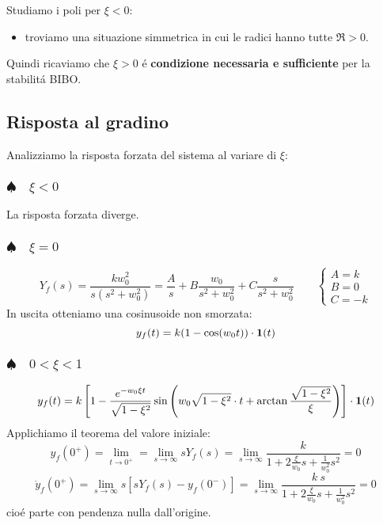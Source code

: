 \documentclass[../main.tex]{subfiles}
\begin{document}
		Studiamo i poli per $ \xi < 0 $:
		\begin{itemize}
			\item troviamo una situazione simmetrica in cui le radici hanno tutte $ \Re > 0 $.
		\end{itemize}
		Quindi ricaviamo che $ \xi > 0 $ \'e \textbf{condizione necessaria e sufficiente} per la stabilit\'a BIBO.
		
	\subsection{Risposta al gradino}
		Analizziamo la risposta forzata del sistema al variare di $ \xi $:
	
	\subsubsection{$ \spadesuit \quad \xi < 0 $}
		La risposta forzata diverge.
		
	\subsubsection{$ \spadesuit \quad \xi = 0 $}
		\[
			Y_f(s) = \frac{kw_0^2}{s(s^2+w_0^2)} = \frac{A}{s} + B\frac{w_0}{s^2+w_0^2} + C\frac{s}{s^2+w_0^2}
			\qquad
			\begin{cases}
				A = k\\
				B = 0\\
				C = -k
			\end{cases}
		\]
		In uscita otteniamo una cosinusoide non smorzata:
		\[
			y_f(t) = k(1-\cos(w_0t)) \cdot \textbf{1}(t)
		\]
		
	\subsubsection{$ \spadesuit \quad 0 < \xi < 1 $}
		\[ 
			y_f(t) = k \left[ 1 - \frac{e^{-w_0\xi t}}{\sqrt{1-\xi^2}} \sin\left( w_0 \sqrt{1-\xi^2} \cdot t + \arctan \frac{\sqrt{1-\xi^2}}{\xi} \right) \right] \cdot \textbf{1}(t) 
		\]
		Applichiamo il teorema del valore iniziale:
		\[ 
			y_f(0^+) = \lim_{t \to 0^+} = \lim_{s \to \infty} s Y_f(s) = \lim_{s \to \infty} \frac{k}{1 + 2\frac{\xi}{w_0}s + \frac{1}{w_0^2}s^2} = 0
		\]
		\[ 
			\dot y_f(0^+) = \lim_{s \to \infty} s \left[ sY_f(s) - y_f(0^-) \right] = \lim_{s \to \infty} \frac{k\ s}{1 + 2\frac{\xi}{w_0}s + \frac{1}{w_0^2}s^2} = 0
		\]
		cio\'e parte con pendenza nulla dall'origine.
		
\end{document}
